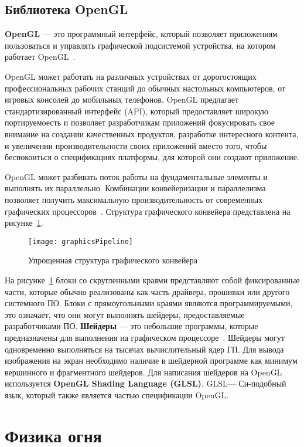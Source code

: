 \subsection{Библиотека OpenGL}

\textbf{OpenGL} --- это программный интерфейс, который позволяет приложениям
пользоваться и управлять графической подсистемой устройства, на котором работает
OpenGL~\cite{OGLSuperbible}.

OpenGL может работать на различных устройствах от дорогостоящих профессиональных
рабочих станций до обычных настольных компьютеров, от игровых консолей до
мобильных телефонов. OpenGL предлагает стандартизированный интерфейс (API),
который предоставляет широкую портируемоесть и позволяет разработчикам
приложений фокусировать свое внимание на создании качественных продуктов,
разработке интересного контента, и увеличении производительности своих
приложений вместо того, чтобы беспокоиться о спецификациях платформы, для
которой они создают приложение.

OpenGL может разбивать поток работы на фундаментальные элементы и выполнять их
параллельно. Комбинации конвейеризации и параллелизма позволяет получить
максимальную производительность от современных графических
процессоров~\cite{OGLSuperbible}.  Структура графического конвейера представлена
на рисунке~\ref{fig:graphicsPipeline}.
\begin{figure}[htb]
	\centering
	\texttt{[image: graphicsPipeline]}
	\caption{Упрощенная структура графического конвейера}%
    \label{fig:graphicsPipeline}
\end{figure}
На рисунке~\ref{fig:graphicsPipeline} блоки со скругленными краями представляют
собой фиксированные части, которые обычно реализованы как часть драйвера,
прошивки или другого системного ПО. Блоки с прямоугольными краями являются
программируемыми, это означает, что они могут выполнять шейдеры, предоставляемые
разработчиками ПО. \textbf{Шейдеры} --- это небольшие программы, которые предназначены
для выполнения на графическом процессоре~\cite{LearnOGL}. Шейдеры могут
одновременно выполняться на тысячах вычислительный ядер ГП. Для вывода
изображения на экран необходимо наличие в шейдерной программе как минимум
вершинного и фрагментного шейдеров. Для написания шейдеров на OpenGL
используется \textbf{OpenGL Shading Language (GLSL)}. GLSL\@--- Си-подобный язык,
который также является частью спецификации OpenGL\@.

\section{Физика огня}

